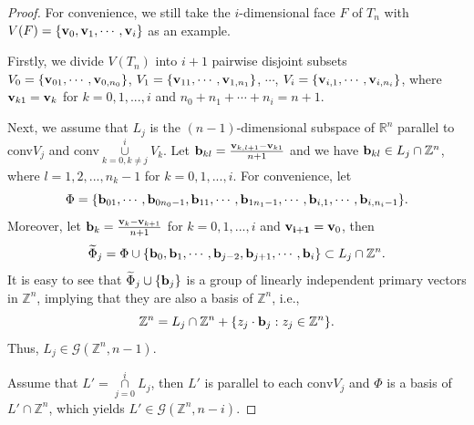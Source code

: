 \documentclass{amsart}
\theoremstyle{definition}
\theoremstyle{remark}
\numberwithin{equation}{section}
\begin{document}
\begin{proof}
    For convenience, we still take the $i$-dimensional face $F$ of $T_n$ with $V(F)=\{{\bf v}_0,{\bf v}_1,\cdots,{\bf v}_i\}$ as an example.

Firstly, we divide $V(T_n)$ into $i+1$ pairwise disjoint subsets $V_0=\{{\bf v}_{01},\cdots,{\bf v}_{0,n_0}\}$, $V_1=\{{\bf v}_{11},\cdots,{\bf v}_{1,n_1}\}$, $\cdots$, $V_i=\{{\bf v}_{i,1},\cdots,{\bf v}_{i,n_i}\}$, where ${\bf v}_{k1}={\bf v}_k$ for $k=0,1,...,i$ and $n_0+n_1+\cdots+n_i=n+1$.


Next, we assume that $L_j$ is the $(n-1)$-dimensional subspace of $\mathbb{R}^n$ parallel to conv$V_j$ and conv$\underset{k=0,k\not=j}{\overset{i}{\cup}}V_k$. Let ${\bf b}_{kl}=\frac{{\bf v}_{k,l+1}-{\bf v}_{k1}}{n+1}$ and we have ${\bf b}_{kl}\in L_j\cap\mathbb{Z}^n$, where $l=1,2,...,n_k-1$ for $k=0,1,...,i$. For convenience, let $$\Phi=\{{\bf b}_{01},\cdots,{\bf b}_{0n_0-1},{\bf b}_{11},\cdots,{\bf b}_{1n_1-1},\cdots,{\bf b}_{i,1},\cdots,{\bf b}_{i,n_i-1}\}.$$
Moreover, let ${\bf b}_k=\frac{{\bf v}_k-{\bf v}_{k+1}}{n+1}$ for $k=0,1,...,i$ and ${\bf v_{i+1}}={\bf v}_0$, then
$$\widetilde{\Phi}_j=\Phi\cup\{{\bf b}_0,{\bf b}_1,\cdots,{\bf b}_{j-2},{\bf b}_{j+1},\cdots,{\bf b}_i\}\subset L_j\cap\mathbb{Z}^n.$$
It is easy to see that $\widetilde{\Phi}_j\cup\{{\bf b}_j\}$ is a group of linearly independent primary vectors in $\mathbb{Z}^n$, implying that they are also a basis of $\mathbb{Z}^n$, i.e.,
$$\mathbb{Z}^n=L_j\cap\mathbb{Z}^n+\{z_j\cdot{\bf b}_j:z_j\in\mathbb{Z}^n\}.$$
Thus, $L_j\in\mathcal{G}(\mathbb{Z}^n,n-1)$.

Assume that $L'=\underset{j=0}{\overset{i}{\cap}}L_j$, then $L'$ is parallel to each $\mathrm{conv}V_j$ and $\Phi$ is a basis of $L'\cap\mathbb{Z}^n$, which yields $L'\in\mathcal{G}(\mathbb{Z}^n,n-i)$. 


\end{proof}
\end{document}
